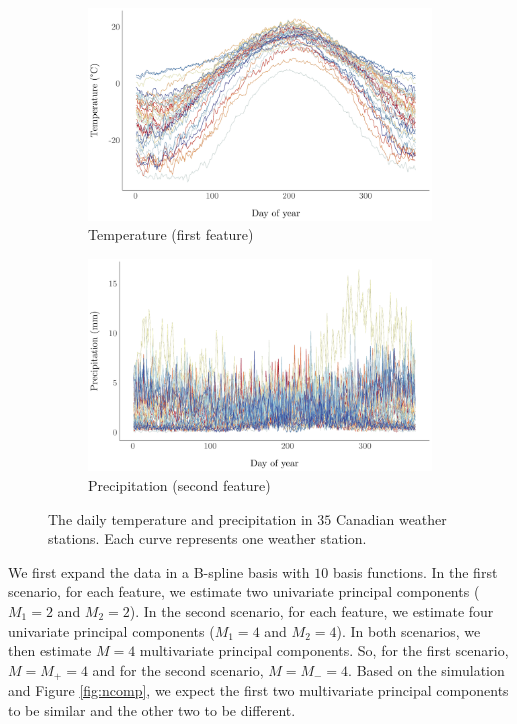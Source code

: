 \documentclass{article}
\newcounter{th}
\newcounter{scenario}[section]
\begin{document}
\begin{figure}
     \centering
     \begin{subfigure}[b]{0.49\textwidth}
         \centering
         \includegraphics[width=1\textwidth]{figures/temperature.pdf}
         \caption{Temperature (first feature)}
         \label{fig:temperature}
     \end{subfigure}
     \hfill
     \begin{subfigure}[b]{0.49\textwidth}
         \centering
         \includegraphics[width=1\textwidth]{figures/precipitation.pdf}
         \caption{Precipitation (second feature)}
         \label{fig:precipitation}
     \end{subfigure}
     \caption{The daily temperature and precipitation in $35$ Canadian weather stations. Each curve represents one weather station.}
     \label{fig:weather}
\end{figure}

We first expand the data in a B-spline basis with $10$ basis functions. In the first scenario, for each feature, we estimate two univariate principal components ($M_1 = 2$ and $M_2 = 2$). In the second scenario, for each feature, we estimate four univariate principal components ($M_1 = 4$ and $M_2 = 4$). In both scenarios, we then estimate $M = 4$ multivariate principal components. So, for the first scenario, $M = M_{+} = 4$ and for the second scenario, $M = M_{-} = 4$. Based on the simulation and Figure \ref{fig:ncomp}, we expect the first two multivariate principal components to be similar and the other two to be different.
\end{document}
